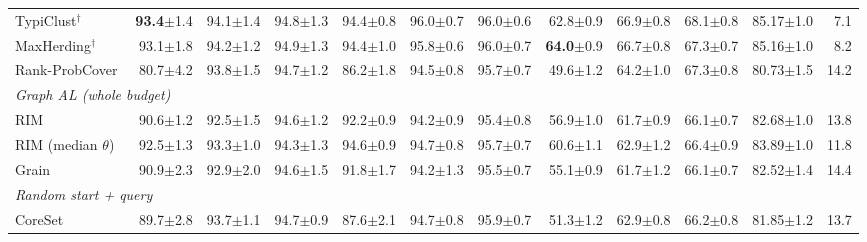 \begin{table}[t]
\begin{adjustbox}{max width=\textwidth}
\begin{tabular}{lrrrrrrrrrrr}
\quad TypiClust$^{\dagger}$~\cite{hacohen2022active} & \textbf{93.4}{\scriptsize$\pm$1.4} & 94.1{\scriptsize$\pm$1.4} & 94.8{\scriptsize$\pm$1.3} & 94.4{\scriptsize$\pm$0.8} & 96.0{\scriptsize$\pm$0.7} & 96.0{\scriptsize$\pm$0.6} & 62.8{\scriptsize$\pm$0.9} & 66.9{\scriptsize$\pm$0.8} & 68.1{\scriptsize$\pm$0.8} & 85.17{\scriptsize$\pm$1.0} & 7.1 \\
\quad MaxHerding$^{\dagger}$~\cite{bae2024generalized} & 93.1{\scriptsize$\pm$1.8} & 94.2{\scriptsize$\pm$1.2} & 94.9{\scriptsize$\pm$1.3} & 94.4{\scriptsize$\pm$1.0} & 95.8{\scriptsize$\pm$0.6} & 96.0{\scriptsize$\pm$0.7} & \textbf{64.0}{\scriptsize$\pm$0.9} & 66.7{\scriptsize$\pm$0.8} & 67.3{\scriptsize$\pm$0.7} & 85.16{\scriptsize$\pm$1.0} & 8.2 \\
\quad Rank-ProbCover & 80.7{\scriptsize$\pm$4.2} & 93.8{\scriptsize$\pm$1.5} & 94.7{\scriptsize$\pm$1.2} & 86.2{\scriptsize$\pm$1.8} & 94.5{\scriptsize$\pm$0.8} & 95.7{\scriptsize$\pm$0.7} & 49.6{\scriptsize$\pm$1.2} & 64.2{\scriptsize$\pm$1.0} & 67.3{\scriptsize$\pm$0.8} & 80.73{\scriptsize$\pm$1.5} & 14.2 \\
\multicolumn{12}{l}{\textit{Graph AL (whole budget)}} \\
\quad RIM~\cite{zhang2021rim} & 90.6{\scriptsize$\pm$1.2} & 92.5{\scriptsize$\pm$1.5} & 94.6{\scriptsize$\pm$1.2} & 92.2{\scriptsize$\pm$0.9} & 94.2{\scriptsize$\pm$0.9} & 95.4{\scriptsize$\pm$0.8} & 56.9{\scriptsize$\pm$1.0} & 61.7{\scriptsize$\pm$0.9} & 66.1{\scriptsize$\pm$0.7} & 82.68{\scriptsize$\pm$1.0} & 13.8 \\
\quad RIM (median $\theta$)~\cite{zhang2021rim} & 92.5{\scriptsize$\pm$1.3} & 93.3{\scriptsize$\pm$1.0} & 94.3{\scriptsize$\pm$1.3} & 94.6{\scriptsize$\pm$0.9} & 94.7{\scriptsize$\pm$0.8} & 95.7{\scriptsize$\pm$0.7} & 60.6{\scriptsize$\pm$1.1} & 62.9{\scriptsize$\pm$1.2} & 66.4{\scriptsize$\pm$0.9} & 83.89{\scriptsize$\pm$1.0} & 11.8 \\
\quad Grain~\cite{zhang2021grain} & 90.9{\scriptsize$\pm$2.3} & 92.9{\scriptsize$\pm$2.0} & 94.6{\scriptsize$\pm$1.5} & 91.8{\scriptsize$\pm$1.7} & 94.2{\scriptsize$\pm$1.3} & 95.5{\scriptsize$\pm$0.7} & 55.1{\scriptsize$\pm$0.9} & 61.7{\scriptsize$\pm$1.2} & 66.1{\scriptsize$\pm$0.7} & 82.52{\scriptsize$\pm$1.4} & 14.4 \\
\multicolumn{12}{l}{\textit{Random start + query}} \\
\quad CoreSet~\cite{sener2017active} & 89.7{\scriptsize$\pm$2.8} & 93.7{\scriptsize$\pm$1.1} & 94.7{\scriptsize$\pm$0.9} & 87.6{\scriptsize$\pm$2.1} & 94.7{\scriptsize$\pm$0.8} & 95.9{\scriptsize$\pm$0.7} & 51.3{\scriptsize$\pm$1.2} & 62.9{\scriptsize$\pm$0.8} & 66.2{\scriptsize$\pm$0.8} & 81.85{\scriptsize$\pm$1.2} & 13.7 \\

\end{tabular}
\end{adjustbox}
\end{table}
